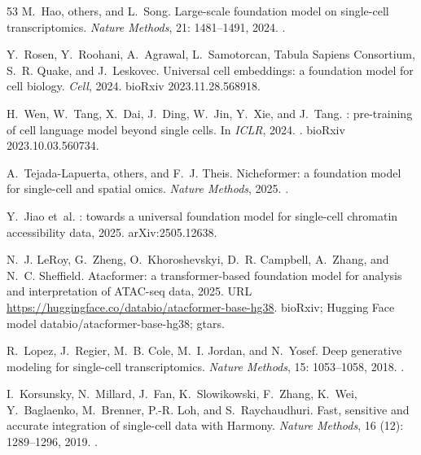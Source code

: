 \documentclass[fleqn,10pt,lineno]{wlpeerj}  %
\begin{document}
\begin{thebibliography}{53}
M.~Hao, others, and L.~Song.
\newblock Large-scale foundation model on single-cell transcriptomics.
\newblock \emph{Nature Methods}, 21: 1481--1491, 2024.
\newblock {}.

Y.~Rosen, Y.~Roohani, A.~Agrawal, L.~Samotorcan, {Tabula Sapiens Consortium},
  S.~R. Quake, and J.~Leskovec.
\newblock Universal cell embeddings: a foundation model for cell biology.
\newblock \emph{Cell}, 2024.
\newblock bioRxiv 2023.11.28.568918.

H.~Wen, W.~Tang, X.~Dai, J.~Ding, W.~Jin, Y.~Xie, and J.~Tang.
: pre-training of cell language model beyond single cells.
\newblock In \emph{ICLR}, 2024.
\newblock {}.
\newblock bioRxiv 2023.10.03.560734.

A.~Tejada-Lapuerta, others, and F.~J. Theis.
\newblock Nicheformer: a foundation model for single-cell and spatial omics.
\newblock \emph{Nature Methods}, 2025.
\newblock {}.

Y.~Jiao et~al.
: towards a universal foundation model for single-cell
  chromatin accessibility data, 2025.
\newblock arXiv:2505.12638.

N.~J. LeRoy, G.~Zheng, O.~Khoroshevskyi, D.~R. Campbell, A.~Zhang, and N.~C.
  Sheffield.
\newblock Atacformer: a transformer-based foundation model for analysis and
  interpretation of {ATAC}-seq data, 2025.
\newblock URL \url{https://huggingface.co/databio/atacformer-base-hg38}.
\newblock bioRxiv; Hugging Face model databio/atacformer-base-hg38; gtars.

R.~Lopez, J.~Regier, M.~B. Cole, M.~I. Jordan, and N.~Yosef.
\newblock Deep generative modeling for single-cell transcriptomics.
\newblock \emph{Nature Methods}, 15: 1053--1058, 2018.
\newblock {}.

I.~Korsunsky, N.~Millard, J.~Fan, K.~Slowikowski, F.~Zhang, K.~Wei,
  Y.~Baglaenko, M.~Brenner, P.-R. Loh, and S.~Raychaudhuri.
\newblock Fast, sensitive and accurate integration of single-cell data with
  {Harmony}.
\newblock \emph{Nature Methods}, 16 (12): 1289--1296, 2019.
\newblock {}.


\end{thebibliography}
\end{document}
